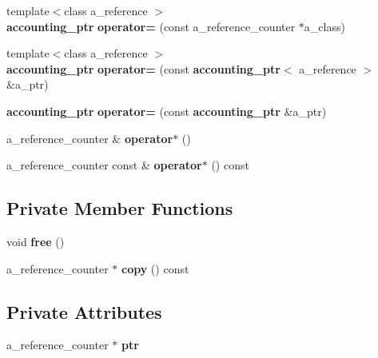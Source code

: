 \begin{DoxyCompactItemize}
\item 
{\footnotesize template$<$class a\-\_\-reference $>$ }\\{\bf accounting\-\_\-ptr} {\bfseries operator=} (const a\-\_\-reference\-\_\-counter $\ast$a\-\_\-class)\label{classaccounting__ptr_adde01fbb34705176f47b22f465e74f70}

\item 
{\footnotesize template$<$class a\-\_\-reference $>$ }\\{\bf accounting\-\_\-ptr} {\bfseries operator=} (const {\bf accounting\-\_\-ptr}$<$ a\-\_\-reference $>$ \&a\-\_\-ptr)\label{classaccounting__ptr_a2f9216b157ea06ec540ad3c140c6cd25}

\item 
{\bf accounting\-\_\-ptr} {\bfseries operator=} (const {\bf accounting\-\_\-ptr} \&a\-\_\-ptr)\label{classaccounting__ptr_a6adc37a7b370d74b681dc50b39cc1312}

\item 
a\-\_\-reference\-\_\-counter \& {\bfseries operator$\ast$} ()\label{classaccounting__ptr_aa8f3ff834d038b0daae9cfc3dc5b4440}

\item 
a\-\_\-reference\-\_\-counter const \& {\bfseries operator$\ast$} () const \label{classaccounting__ptr_a23744e5e25f9e40287f4171649a8d7b4}

\end{DoxyCompactItemize}
\subsection*{Private Member Functions}
\begin{DoxyCompactItemize}
\item 
void {\bfseries free} ()\label{classaccounting__ptr_a80bc13a40d700a393957440b323f85cf}

\item 
a\-\_\-reference\-\_\-counter $\ast$ {\bfseries copy} () const \label{classaccounting__ptr_a52236e3c2c6495ed4cef87ab94c5b71a}

\end{DoxyCompactItemize}
\subsection*{Private Attributes}
\begin{DoxyCompactItemize}
\item 
a\-\_\-reference\-\_\-counter $\ast$ {\bfseries ptr}\label{classaccounting__ptr_a5ea56688db6727a075933b2e1c41e05b}

\end{DoxyCompactItemize}
